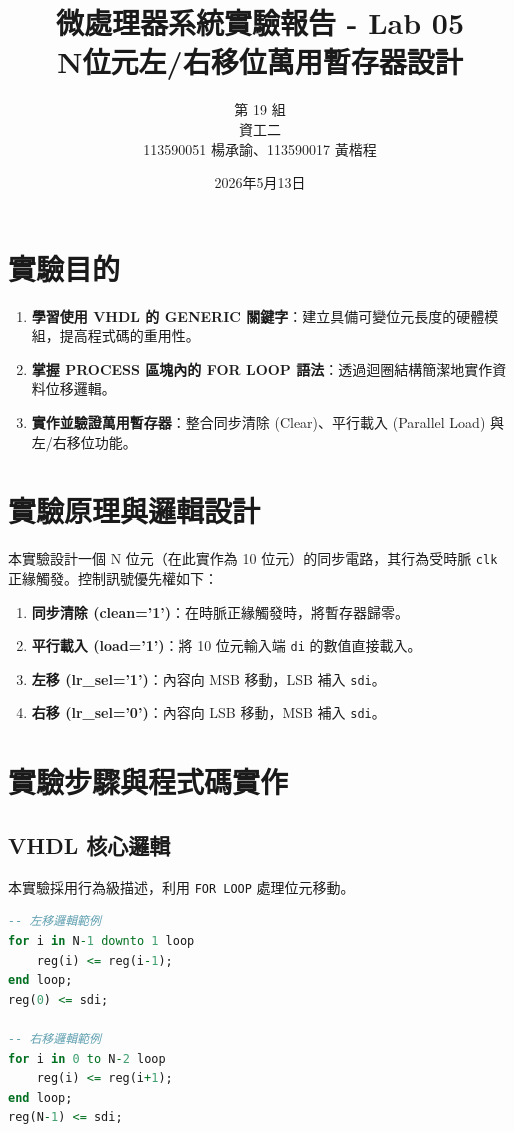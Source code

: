 \documentclass[12pt, a4paper]{article}
\title{微處理器系統實驗報告 - Lab 05 \\ \Large N位元左/右移位萬用暫存器設計}
\author{第 19 組 \\ 資工二 \\ 113590051 楊承諭、113590017 黃楷程}
\date{2026年5月13日}
\begin{document}
\maketitle
\newpage

\section{實驗目的}
\begin{enumerate}
    \item \textbf{學習使用 VHDL 的 GENERIC 關鍵字}：建立具備可變位元長度的硬體模組，提高程式碼的重用性。
    \item \textbf{掌握 PROCESS 區塊內的 FOR LOOP 語法}：透過迴圈結構簡潔地實作資料位移邏輯。
    \item \textbf{實作並驗證萬用暫存器}：整合同步清除 (Clear)、平行載入 (Parallel Load) 與左/右移位功能。
\end{enumerate}

\section{實驗原理與邏輯設計}
本實驗設計一個 N 位元（在此實作為 10 位元）的同步電路，其行為受時脈 \texttt{clk} 正緣觸發。控制訊號優先權如下：

\begin{enumerate}
    \item \textbf{同步清除 (clean='1')}：在時脈正緣觸發時，將暫存器歸零。
    \item \textbf{平行載入 (load='1')}：將 10 位元輸入端 \texttt{di} 的數值直接載入。
    \item \textbf{左移 (lr\_sel='1')}：內容向 MSB 移動，LSB 補入 \texttt{sdi}。
    \item \textbf{右移 (lr\_sel='0')}：內容向 LSB 移動，MSB 補入 \texttt{sdi}。
\end{enumerate}

\section{實驗步驟與程式碼實作}

\subsection{VHDL 核心邏輯}
本實驗採用行為級描述，利用 \texttt{FOR LOOP} 處理位元移動。

\begin{lstlisting}[language=VHDL, caption=N\_bit\_DFF.vhd 核心移位邏輯]
-- 左移邏輯範例
for i in N-1 downto 1 loop
    reg(i) <= reg(i-1);
end loop;
reg(0) <= sdi;

-- 右移邏輯範例
for i in 0 to N-2 loop
    reg(i) <= reg(i+1);
end loop;
reg(N-1) <= sdi;
\end{lstlisting}
\end{document}
